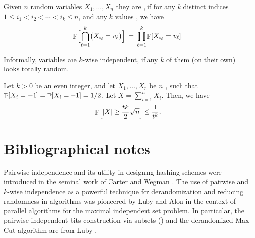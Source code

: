 \begin{defn}
    Given $n$ random variables $X_1, \ldots, X_n$ they are
    , if for any $k$ distinct indices
    $1 \leq i_1 < i_2 < \cdots < i_k \leq n$, and any $k$ values ,
    we have
    \begin{equation*}
        \Prob{\Bigl. \smash{\bigcap_{\ell=1}^k} \bigl(X_{i_{\ell}} = v_\ell\bigr)}%
        \,=\,%
        \prod_{\ell=1}^k \Prob{  X_{i_{\ell}} = v_\ell }.
    \end{equation*}
\end{defn}
Informally, variables are $k$-wise independent, if any
$k$ of them (on their own) looks totally random.

\begin{lemma}
    Let $k > 0 $ be an even integer, and let $X_1, \ldots, X_n$ be $n$
    , such
    that $\Prob{X_i=-1} = \Prob{X_i =+1} = 1/2$. Let
    $X = \sum_{i=1}^n X_i$. Then, we have
    \begin{align*}
      \Prob{\smash{\cardin{X} \geq \frac{tk}{2} \sqrt{n}}\Bigr.}%
      \leq%
      \frac{1}{t^k}.
    \end{align*}
\end{lemma}



\section{Bibliographical notes}

Pairwise independence and its utility in designing hashing schemes were
introduced in the seminal work of Carter and Wegman
\cite{cw-uchf-79}. The use of pairwise and $k$-wise independence as a
powerful technique for derandomization and reducing randomness in
algorithms was pioneered by Luby \cite{l-spar-86} and Alon \etal
\cite{abi-fsrpa-86} in the context of parallel algorithms for the maximal
independent set problem. In particular, the pairwise independent bits
construction via subsets () and the derandomized Max-Cut
algorithm are from Luby \cite{l-spar-86}.

